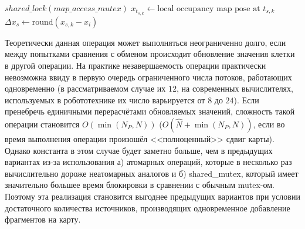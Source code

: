 \begin{algorithm}
	\small
	\caption{Добавление фрагмента (модификация с  разделяемыми блокировками): $update\_map(P_s, t_{s,k}, x_{s,k})$}\label{alg:partially_lockfree_upd}
	$shared\_lock(map\_access\_mutex)$\;
	$x_{t_{s,k}} \gets \text{local occupancy map pose at } t_{s,k}$\;
	$\Delta x_{s} \gets \text{round}(x_{s,k} - x_{i})$\;
\end{algorithm} 

Теоретически данная операция может выполняться неограниченно долго, если между попытками сравнения с обменом происходит обновление значения клетки в другой операции. На практике незавершаемость операции практически невозможна ввиду в первую очередь ограниченного числа потоков, работающих одновременно (в рассматриваемом случае их $12$, на современных вычислителях, используемых в робототехнике их число варьируется от $8$ до $24$). Если пренебречь единичными перерасчётами обновляемых значений, сложность такой операции становится $O(\min(N_P, N))$ ($O(\widehat{N} + \min(N_P, N))$, если во время выполнения операции произошёл <<полноценный>> сдвиг карты). Однако константа в этом случае будет заметно больше, чем в предыдущих вариантах из-за использования а) атомарных операций, которые в несколько раз вычислительно дороже неатомарных аналогов и б) shared\_mutex, который имеет значительно большее время блокировки в сравнении с обычным mutex-ом. Поэтому эта реализация становится выгоднее предыдущих вариантов при условии достаточного количества источников, производящих одновременное добавление фрагментов на карту. 


